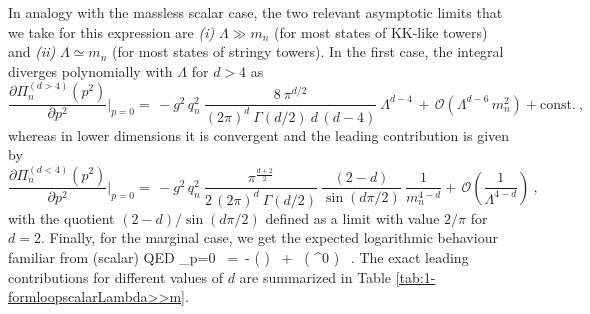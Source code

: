 In analogy with the massless scalar case, the two relevant asymptotic limits that we take for this expression are \emph{(i)} $\Lambda \gg m_n$ (for most states of KK-like towers) and \emph{(ii)} $\Lambda \simeq m_n$ (for most states of stringy towers). In the first case, the integral diverges polynomially with $\Lambda$ for $d>4$ as 
%
\begin{equation}
			\frac {\partial \Pi_n^{(d>4)}(p^2)}{\partial p^2} \bigg\rvert_{p=0} = \, -g^2 \, q_n^2\  \frac{8\ \pi^{d/2}}{(2 \pi)^d\ \Gamma\left( d/2 \right) \ d\, (d-4)}    \ \Lambda^{d-4} \, + \, \mathcal{O}\left(\Lambda^{d-6}\, m_n^2\right) + \mathrm{const.} \ ,
\label{eq:1formloopfermionsd>4}
\end{equation}
%
whereas in lower dimensions it is convergent and the leading contribution is given by
%
\begin{equation}
			\frac {\partial \Pi_n^{(d<4)}(p^2)}{\partial p^2} \bigg\rvert_{p=0} = \, - g^2 \, q_n^2 \ \frac{\pi^{\frac{d+2}{2}} }{2 \, (2 \pi)^d  \ \Gamma\left( d/2 \right)} \ \frac{(2-d)}{\sin\left( d \pi/2\right)} \ \frac{1}{m_n^{4-d}} + \, \mathcal{O}\left(\frac{1}{\Lambda^{4-d}}\right)  \ ,
\label{eq:1formloopfermionsd<4}
\end{equation}
%
with the quotient $(2-d)/\sin\left( d \pi/2\right)$ defined as a limit with value $2/ \pi$ for $d=2$. Finally, for the marginal case, we get the expected logarithmic behaviour familiar from (scalar) QED
%
\beq
		 \bigg\rvert_{p=0} \, =\, -  \log \left(  \right) \ + \ \left( \Lambda^0 \right)  \, .
\label{eq:1formloopscalard=4}
\eeq
%
The exact leading contributions for different values of $d$ are summarized in Table \ref{tab:1-formloopscalarLambda>>m}.
%
